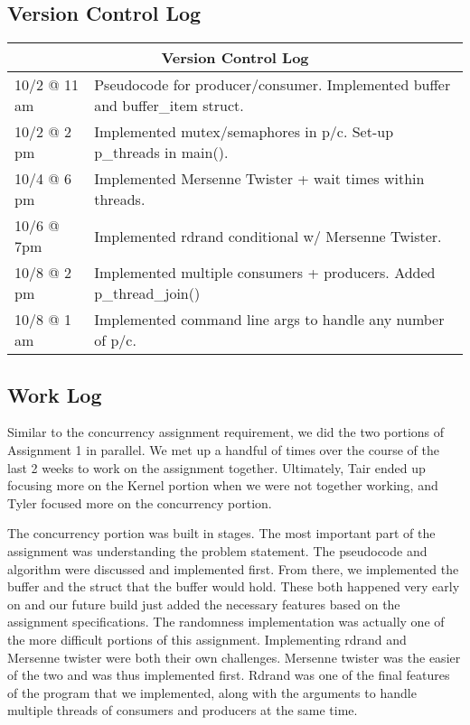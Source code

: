 \documentclass{article}
\begin{document}
\subsection{Version Control Log}
\begin{tabular}{ |l|l| }
  \hline
  \multicolumn{2}{|c|}{Version Control Log} \\
  \hline
  10/2 @ 11 am & Pseudocode for producer/consumer. Implemented buffer and buffer\_item struct. \\
  10/2 @ 2 pm & Implemented mutex/semaphores in p/c. Set-up p\_threads in main(). \\
  10/4 @ 6 pm & Implemented Mersenne Twister + wait times within threads. \\
  10/6 @ 7pm & Implemented rdrand conditional w/ Mersenne Twister. \\
  10/8 @ 2 pm & Implemented multiple consumers + producers. Added p\_thread\_join()\\
  10/8 @ 1 am & Implemented command line args to handle any number of p/c. \\
  \hline
\end{tabular}

\subsection{Work Log}
Similar to the concurrency assignment requirement, we did the two portions of Assignment 1 in parallel. We met up a handful of times over the course of the last 2 weeks to work on the assignment together. Ultimately, Tair ended up focusing more on the Kernel portion when we were not together working, and Tyler focused more on the concurrency portion. 

The concurrency portion was built in stages. The most important part of the assignment was understanding the problem statement. The pseudocode and algorithm were discussed and implemented first. From there, we implemented the buffer and the struct that the buffer would hold. These both happened very early on and our future build just added the necessary features based on the assignment specifications. The randomness implementation was actually one of the more difficult portions of this assignment. Implementing rdrand and Mersenne twister were both their own challenges. Mersenne twister was the easier of the two and was thus implemented first. Rdrand was one of the final features of the program that we implemented, along with the arguments to handle multiple threads of consumers and producers at the same time.
\end{document}
